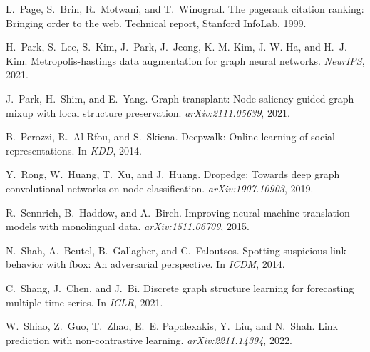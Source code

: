 \documentclass[11pt]{article}
\begin{document}
\begin{thebibliography}{10}
\begin{small}
L.~Page, S.~Brin, R.~Motwani, and T.~Winograd.
\newblock The pagerank citation ranking: Bringing order to the web.
\newblock Technical report, Stanford InfoLab, 1999.

H.~Park, S.~Lee, S.~Kim, J.~Park, J.~Jeong, K.-M. Kim, J.-W. Ha, and H.~J. Kim.
\newblock Metropolis-hastings data augmentation for graph neural networks.
\newblock \emph{NeurIPS}, 2021{}.

J.~Park, H.~Shim, and E.~Yang.
\newblock Graph transplant: Node saliency-guided graph mixup with local
  structure preservation.
\newblock \emph{arXiv:2111.05639}, 2021{}.

B.~Perozzi, R.~Al-Rfou, and S.~Skiena.
\newblock Deepwalk: Online learning of social representations.
\newblock In \emph{KDD}, 2014.

Y.~Rong, W.~Huang, T.~Xu, and J.~Huang.
\newblock Dropedge: Towards deep graph convolutional networks on node
  classification.
\newblock \emph{arXiv:1907.10903}, 2019.

R.~Sennrich, B.~Haddow, and A.~Birch.
\newblock Improving neural machine translation models with monolingual data.
\newblock \emph{arXiv:1511.06709}, 2015.

N.~Shah, A.~Beutel, B.~Gallagher, and C.~Faloutsos.
\newblock Spotting suspicious link behavior with fbox: An adversarial
  perspective.
\newblock In \emph{ICDM}, 2014.

C.~Shang, J.~Chen, and J.~Bi.
\newblock Discrete graph structure learning for forecasting multiple time
  series.
\newblock In \emph{ICLR}, 2021.

W.~Shiao, Z.~Guo, T.~Zhao, E.~E. Papalexakis, Y.~Liu, and N.~Shah.
\newblock Link prediction with non-contrastive learning.
\newblock \emph{arXiv:2211.14394}, 2022.


\end{small}
\end{thebibliography}
\end{document}

